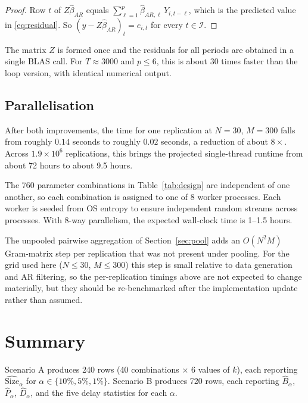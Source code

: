 \documentclass[12pt]{article}
\begin{document}
\begin{proof}
Row $t$ of $Z\hat\beta_{AR}$ equals
$\sum_{\ell=1}^p \hat\beta_{AR,\ell}\,Y_{i,t-\ell}$, which is the
predicted value in \eqref{eq:residual}. So
$(y - Z\hat\beta_{AR})_t = \hat e_{i,t}$ for every $t\in\mathcal{I}$.
\end{proof}

The matrix $Z$ is formed once and the residuals for all periods are
obtained in a single BLAS call. For $T\approx3000$ and $p\le6$, this is
about 30 times faster than the loop version, with identical numerical
output.

\subsection{Parallelisation}
\label{subsec:aggregate}

After both improvements, the time for one replication at $N=30$, $M=300$
falls from roughly $0.14$ seconds to roughly $0.02$ seconds, a reduction
of about $8\times$. Across $1.9\times10^6$ replications, this brings the
projected single-thread runtime from about 72 hours to about 9.5 hours.

The 760 parameter combinations in Table~\ref{tab:design} are independent
of one another, so each combination is assigned to one of 8 worker
processes. Each worker is seeded from OS entropy to ensure independent
random streams across processes. With 8-way parallelism, the expected
wall-clock time is 1--1.5 hours.

The unpooled pairwise aggregation of Section~\ref{sec:pool} adds an
$O(N^2M)$ Gram-matrix step per replication that was not present under
pooling. For the grid used here ($N\le30$, $M\le300$) this step is small
relative to data generation and AR filtering, so the per-replication
timings above are not expected to change materially, but they should be
re-benchmarked after the implementation update rather than assumed.

\section{Summary}
\label{sec:summary}

Scenario A produces 240 rows (40 combinations $\times$ 6 values of $k$),
each reporting $\widehat{\mathrm{Size}}_\alpha$ for
$\alpha\in\{10\%,5\%,1\%\}$. Scenario B produces 720 rows, each reporting
$\widehat{B}_\alpha$, $\widehat{P}_\alpha$, $\widehat{D}_\alpha$, and the
five delay statistics for each $\alpha$.
\end{document}
